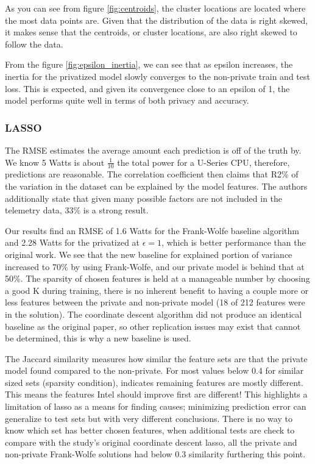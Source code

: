 \documentclass[12pt,letterpaper]{article}
\begin{document}
As you can see from figure \ref{fig:centroids}, the cluster locations are located where the most data points are. Given that the distribution of the data is right skewed, it makes sense that the centroids, or cluster locations, are also right skewed to follow the data. 

From the figure \ref{fig:epsilon_inertia}, we can see that as epsilon increases, the inertia for the privatized model slowly converges to the non-private train and test loss. This is expected, and given its convergence close to an epsilon of 1, the model performs quite well in terms of both privacy and accuracy.

\subsubsection{LASSO}

The RMSE estimates the average amount each prediction is off of the truth by. We know 5 Watts is about $\frac{1}{10}$ the total power for a U-Series CPU, therefore, predictions are reasonable. The correlation coefficient then claims that R2\% of the variation in the dataset can be explained by the model features. The authors additionally state that given many possible factors are not included in the telemetry data, 33\% is a strong result.

Our results find an RMSE of 1.6 Watts for the Frank-Wolfe baseline algorithm and 2.28 Watts for the privatized at $\epsilon=1$, which is better performance than the original work. We see that the new baseline for explained portion of variance increased to 70\% by using Frank-Wolfe, and our private model is behind that at 50\%. The sparsity of chosen features is held at a manageable number by choosing a good K during training, there is no inherent benefit to having a couple more or less features between the private and non-private model (18 of 212 features were in the solution). The coordinate descent algorithm did not produce an identical baseline as the original paper, so other replication issues may exist that cannot be determined, this is why a new baseline is used.

The Jaccard similarity measures how similar the feature sets are that the private model found compared to the non-private. For most values below 0.4 for similar sized sets (sparsity condition), indicates remaining features are mostly different. This means the features Intel should improve first are different! This highlights a limitation of lasso as a means for finding causes; minimizing prediction error can generalize to test sets but with very different conclusions. There is no way to know which set has better chosen features, when additional tests are check to compare with the study’s original coordinate descent lasso, all the private and non-private Frank-Wolfe solutions had below 0.3 similarity furthering this point.
\end{document}
